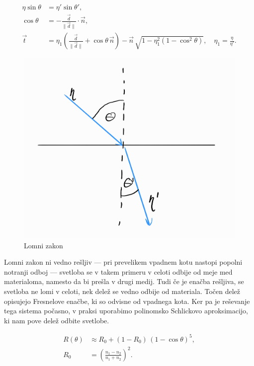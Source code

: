 \documentclass[12pt, a4paper]{article}
\begin{document}
\begin{equation}
	\begin{aligned}
		\eta \sin\theta & = \eta' \sin\theta',                                                              \\
		\cos\theta      & = -\frac{\vec{d}}{\lVert \vec{d} \rVert} \cdot \vec{n},                           \\
		\vec{t}         & = \eta_1 \left(\frac{\vec{d}}{\lVert \vec{d} \rVert} + \cos\theta\,\vec{n}\right)
		- \vec{n}\,\sqrt{1 - \eta_{1}^2\!\left(1 - \cos^2\theta\right)}, \quad \eta_{1} = \frac{\eta}{\eta'}.
	\end{aligned}
\end{equation}

\begin{figure}[H]
	\centering
	\includegraphics[width=\textwidth]{lomni_zakon}
	\caption{Lomni zakon}
\end{figure}

Lomni zakon ni vedno rešljiv — pri prevelikem vpadnem kotu nastopi popolni notranji odboj — svetloba se v takem
primeru v celoti odbije od meje med materialoma, namesto da bi prešla v drugi medij. Tudi če je enačba rešljiva,
se svetloba ne lomi v celoti, nek delež se vedno odbije od materiala. Točen delež opisujejo Fresnelove enačbe, ki
so odvisne od vpadnega kota. Ker pa je reševanje tega sistema počasno, v praksi uporabimo polinomsko Schlickovo
aproksimacijo, ki nam pove delež odbite svetlobe.

\begin{equation}
	\begin{aligned}
		R(\theta) & \approx R_0 + (1 - R_0)\,(1 - \cos\theta)^5,  \\
		R_0       & = \left(\frac{n_1 - n_2}{n_1 + n_2}\right)^2.
	\end{aligned}
\end{equation}
\end{document}
